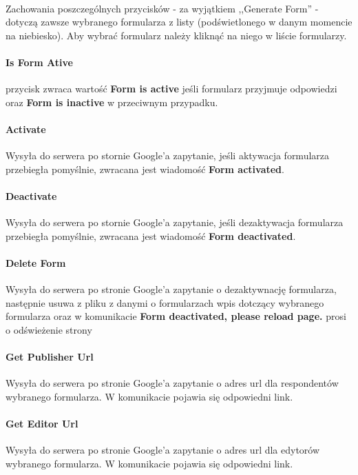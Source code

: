 \\Zachowania poszczególnych przycisków  - za wyjątkiem ,,Generate Form'' - dotyczą zawsze wybranego formularza z listy (podświetlonego w danym momencie na niebiesko). Aby wybrać formularz należy kliknąć na niego w liście formularzy. 
\paragraph{Is Form Ative} przycisk zwraca wartość \textbf{Form is active} jeśli formularz przyjmuje odpowiedzi oraz \textbf{Form is inactive} w przeciwnym przypadku.
\paragraph{Activate} Wysyła do serwera po stornie Google'a zapytanie, jeśli aktywacja formularza przebiegła pomyślnie, zwracana jest wiadomość \textbf{Form activated}.
\paragraph{Deactivate} Wysyła do serwera po stornie Google'a zapytanie, jeśli dezaktywacja formularza przebiegła pomyślnie, zwracana jest wiadomość \textbf{Form deactivated}.
\paragraph{Delete Form} Wysyła do serwera po stronie Google'a zapytanie o dezaktywnację formularza, następnie usuwa z pliku z danymi o formularzach wpis dotczący wybranego formularza oraz w komunikacie \textbf{Form deactivated, please reload page.} prosi o odświeżenie strony
\paragraph{Get Publisher Url} Wysyła do serwera po stronie Google'a zapytanie o adres url dla respondentów wybranego formularza. W komunikacie pojawia się odpowiedni link.
\paragraph{Get Editor Url} Wysyła do serwera po stronie Google'a zapytanie o adres url dla edytorów wybranego formularza. W komunikacie pojawia się odpowiedni link.


